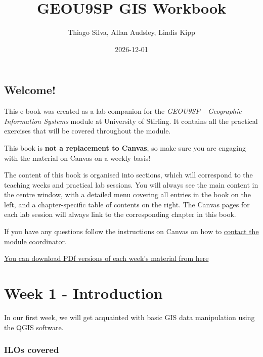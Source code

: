 \documentclass[
  letterpaper,
  DIV=11,
  numbers=noendperiod]{scrreprt}
\title{GEOU9SP GIS Workbook}
\author{Thiago Silva, Allan Audsley, Lindis Kipp}
\date{2026-12-01}
\renewcommand*\contentsname{Table of contents}
\newcommand\contentsname{Table of contents}
\begin{document}
\maketitle

\renewcommand*\contentsname{Table of contents}
{
\hypersetup{linkcolor=}
\setcounter{tocdepth}{2}
\tableofcontents
}


\chapter*{Welcome!}\label{welcome}


This e-book was created as a lab companion for the \emph{GEOU9SP -
Geographic Information Systems} module at University of Stirling. It
contains all the practical exercises that will be covered throughout the
module.

This book is \textbf{not a replacement to Canvas}, so make sure you are
engaging with the material on Canvas on a weekly basis!

The content of this book is organised into sections, which will
correspond to the teaching weeks and practical lab sessions. You will
always see the main content in the centre window, with a detailed menu
covering all entries in the book on the left, and a chapter-specific
table of contents on the right. The Canvas pages for each lab session
will always link to the corresponding chapter in this book.

If you have any questions follow the instructions on Canvas on how to
\href{}{contact the module coordinator}.

\href{https://stir-my.sharepoint.com/:f:/g/personal/ala2_stir_ac_uk/EsP4F6F1Cq9AmT49tSHyTeUByKL4zoPEdZ4zvwGnJZF68A?e=77wlDJ}{You
can download PDf versions of each week's material from here}

\part{Week 1 - Introduction}

In our first week, we will get acquainted with basic GIS data
manipulation using the QGIS software.

\section*{ILOs covered}\label{ilos-covered}
\end{document}
